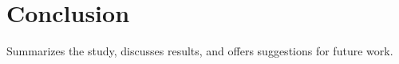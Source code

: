 \chapter{Conclusion}
Summarizes the study, discusses results, and offers suggestions for future work.